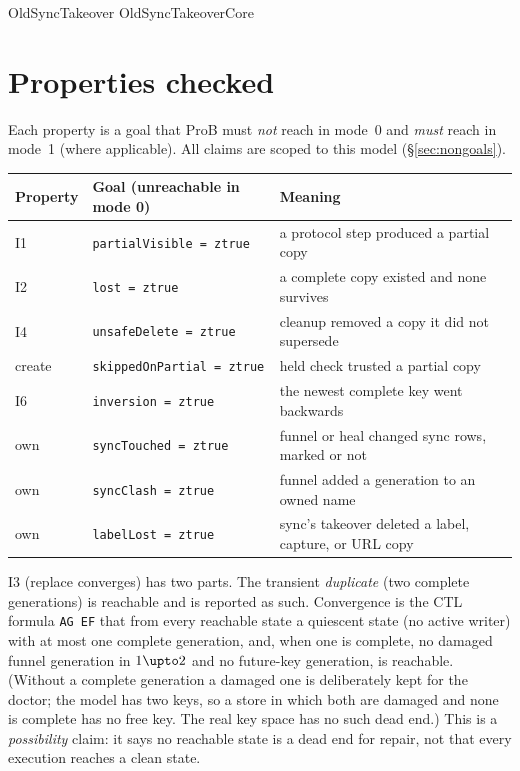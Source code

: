 \documentclass[a4paper,10pt,fleqn]{article}
\newcommand{\field}[1]{\texttt{#1}}
\begin{document}
\begin{zed}
OldSyncTakeover  OldSyncTakeoverCore
\end{zed}

\section{Properties checked}
\label{sec:props}

Each property is a goal that ProB must \emph{not} reach in mode~0 and
\emph{must} reach in mode~1 (where applicable). All claims are scoped to this
model (\S\ref{sec:nongoals}).

\begin{center}
\begin{tabular}{@{}lll@{}}
\toprule
Property & Goal (unreachable in mode 0) & Meaning \\
\midrule
I1 & \field{partialVisible = ztrue} & a protocol step produced a partial copy \\
I2 & \field{lost = ztrue} & a complete copy existed and none survives \\
I4 & \field{unsafeDelete = ztrue} & cleanup removed a copy it did not supersede \\
create & \field{skippedOnPartial = ztrue} & held check trusted a partial copy \\
I6 & \field{inversion = ztrue} & the newest complete key went backwards \\
own & \field{syncTouched = ztrue} & funnel or heal changed sync rows, marked or not \\
own & \field{syncClash = ztrue} & funnel added a generation to an owned name \\
own & \field{labelLost = ztrue} & sync's takeover deleted a label, capture, or URL copy \\
\bottomrule
\end{tabular}
\end{center}

I3 (replace converges) has two parts. The transient \emph{duplicate} (two
complete generations) is reachable and is reported as such. Convergence is the
CTL formula \field{AG EF} that from every reachable state a quiescent state (no
active writer) with at most one complete generation, and, when one is
complete, no damaged funnel generation in $1\upto2$ and no future-key
generation, is reachable. (Without a complete generation a damaged one is
deliberately kept for the doctor; the model has two keys, so a store in which
both are damaged and none is complete has no free key. The real key space has
no such dead end.) This is a \emph{possibility} claim: it says no reachable
state is a dead end for repair, not that every execution reaches a clean state.
\end{document}
